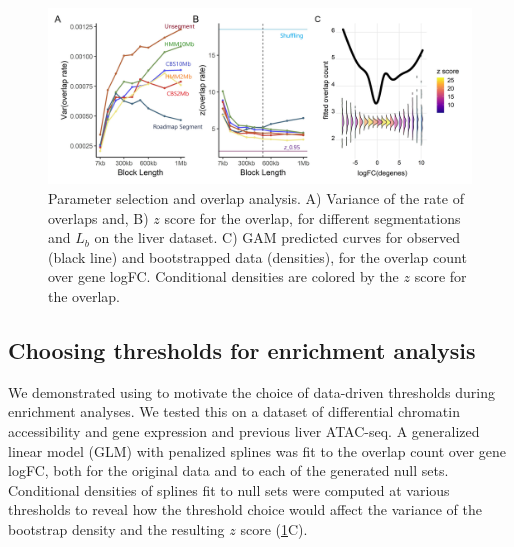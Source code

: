 \begin{figure}[H]
\centering%
\setlength{\abovecaptionskip}{-0.1cm}
\setlength{\belowcaptionskip}{-0.1cm}
\includegraphics[scale=0.06]{Figures/fig2_3.jpeg}
\caption{
  Parameter selection and overlap analysis.
  A) Variance of the rate of overlaps and,
  B) $z$ score for the overlap,
  for different segmentations and $L_b$ on the liver 
  dataset.
  C) GAM predicted curves for observed (black line) and
  bootstrapped data (densities),
  for the overlap count over gene logFC.
  Conditional densities are colored by the $z$ score for the overlap.
}
\label{fig:result}
\end{figure}


\subsection{Choosing thresholds for enrichment analysis}
We demonstrated using \bootranges to motivate the choice of data-driven thresholds 
during enrichment analyses. We tested this on a dataset of differential chromatin accessibility and gene expression 
\citep{alasoo2018shared,lee2020fluent} and previous liver ATAC-seq.
A generalized linear model (GLM) with penalized splines was
fit to the overlap count over gene logFC, both for the original
data and to each of the generated null sets.
Conditional densities of splines fit to null sets
were computed at various thresholds to reveal how
the threshold choice would affect the
variance of the bootstrap density and the resulting $z$ score
(\cref{fig:result}C). 


